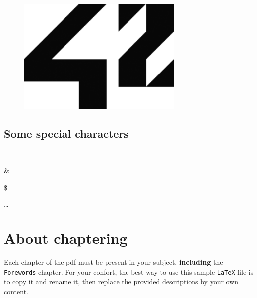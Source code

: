 \documentclass{42-en}
\begin{document}
            \begin{figure}[H]
                \begin{center}
                    \includegraphics[width=8cm]{42.png}
                \end{center}
            \end{figure}


        \newpage


        \subsection{Some special characters}

            \begin{description}\itemsep1pt
                \item [Underscore :] \_
                \item [Ampersand :] \&
                \item [Dollar :] \$
                \item [Elipsis :] \dots
            \end{description}


    \section{About chaptering}

    Each chapter of the pdf must be present in your subject,
    \textbf{including} the \texttt{Forewords} chapter. For your
    confort, the best way to use this sample \texttt{LaTeX} file is to
    copy it and rename it, then replace the provided descriptions by
    your own content.\\

\end{document}
